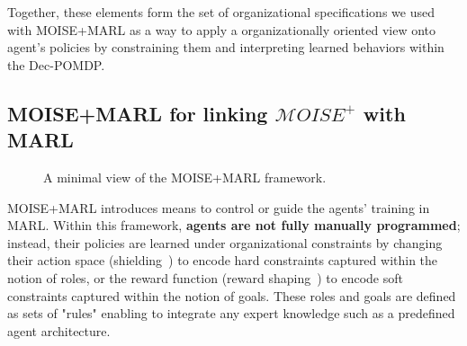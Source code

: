 \documentclass[pdflatex,sn-mathphys-num]{sn-jnl}%
\theoremstyle{thmstyleone}%
\theoremstyle{thmstyletwo}%
\theoremstyle{thmstylethree}%
\begin{document}
\noindent Together, these elements form the set of organizational specifications we used with MOISE+MARL as a way to apply a organizationally oriented view onto agent's policies by constraining them and interpreting learned behaviors within the Dec-POMDP.

\subsection{MOISE+MARL for linking $\mathcal{M}OISE^+$ with MARL}
\label{sec:moise_marl}
\begin{figure}[h!]
    \centering
    
    \caption{A minimal view of the MOISE+MARL framework.}
    \label{fig:mm_synthesis}
\end{figure}


\noindent MOISE+MARL introduces means to control or guide the agents' training in MARL. Within this framework, \textbf{agents are not fully manually programmed}; instead, their policies are learned under organizational constraints by changing their action space (shielding~\cite{alshiekh2018safe}) to encode hard constraints captured within the notion of roles, or the reward function (reward shaping~\cite{marom2018belief}) to encode soft constraints captured within the notion of goals. These roles and goals are defined as sets of "rules" enabling to integrate any expert knowledge such as a predefined agent architecture.
\end{document}
